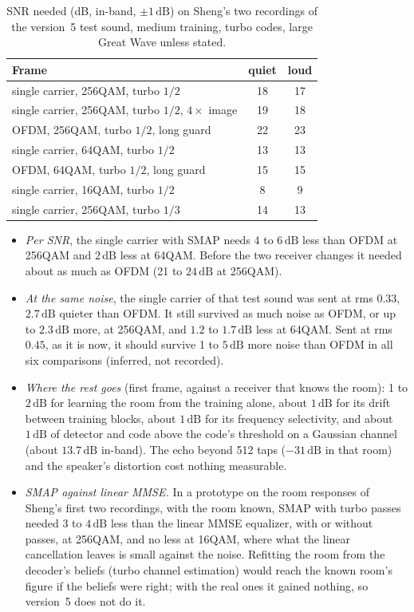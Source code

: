 \documentclass[11pt,a4paper]{article}
\newcommand{\dB}{\,\mathrm{dB}}
\theoremstyle{remark}
\begin{document}
\begin{table}[ht]
\centering
\caption{SNR needed (dB, in-band, $\pm 1\dB$) on Sheng's two recordings of the version~5 test sound, medium training, turbo codes, large Great Wave unless stated.}
\label{tab:scres}
\small
\begin{tabular}{lcc}
\toprule
Frame & quiet & loud\\
\midrule
single carrier, 256QAM, turbo $1/2$ & 18 & 17\\
single carrier, 256QAM, turbo $1/2$, $4\times$ image & 19 & 18\\
OFDM, 256QAM, turbo $1/2$, long guard & 22 & 23\\
single carrier, 64QAM, turbo $1/2$ & 13 & 13\\
OFDM, 64QAM, turbo $1/2$, long guard & 15 & 15\\
single carrier, 16QAM, turbo $1/2$ & 8 & 9\\
single carrier, 256QAM, turbo $1/3$ & 14 & 13\\
\bottomrule
\end{tabular}
\end{table}

\begin{itemize}
\item \emph{Per SNR}, the single carrier with SMAP needs 4 to $6\dB$ less than OFDM at 256QAM and $2\dB$ less at 64QAM. Before the two receiver changes it needed about as much as OFDM (21 to $24\dB$ at 256QAM).
\item \emph{At the same noise}, the single carrier of that test sound was sent at rms $0.33$, $2.7\dB$ quieter than OFDM. It still survived as much noise as OFDM, or up to $2.3\dB$ more, at 256QAM, and $1.2$ to $1.7\dB$ less at 64QAM. Sent at rms $0.45$, as it is now, it should survive 1 to $5\dB$ more noise than OFDM in all six comparisons (inferred, not recorded).
\item \emph{Where the rest goes} (first frame, against a receiver that knows the room): 1 to $2\dB$ for learning the room from the training alone, about $1\dB$ for its drift between training blocks, about $1\dB$ for its frequency selectivity, and about $1\dB$ of detector and code above the code's threshold on a Gaussian channel (about $13.7\dB$ in-band). The echo beyond 512 taps ($-31\dB$ in that room) and the speaker's distortion cost nothing measurable.
\item \emph{SMAP against linear MMSE.} In a prototype on the room responses of Sheng's first two recordings, with the room known, SMAP with turbo passes needed 3 to $4\dB$ less than the linear MMSE equalizer, with or without passes, at 256QAM, and no less at 16QAM, where what the linear cancellation leaves is small against the noise. Refitting the room from the decoder's beliefs (turbo channel estimation) would reach the known room's figure if the beliefs were right; with the real ones it gained nothing, so version~5 does not do it.
\end{itemize}
\end{document}

